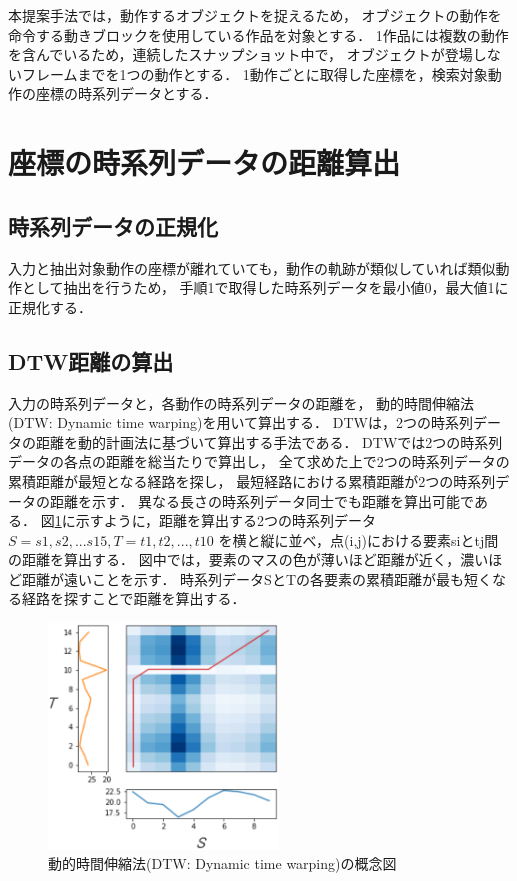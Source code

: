 \documentclass[11pt]{jreport}
\begin{document}
本提案手法では，動作するオブジェクトを捉えるため，
オブジェクトの動作を命令する動きブロックを使用している作品を対象とする．
1作品には複数の動作を含んでいるため，連続したスナップショット中で，
オブジェクトが登場しないフレームまでを1つの動作とする．
1動作ごとに取得した座標を，検索対象動作の座標の時系列データとする．

\section{座標の時系列データの距離算出}

\subsection{時系列データの正規化}
入力と抽出対象動作の座標が離れていても，動作の軌跡が類似していれば類似動作として抽出を行うため，
手順1で取得した時系列データを最小値0，最大値1に正規化する．

\subsection{DTW距離の算出}
入力の時系列データと，各動作の時系列データの距離を，
動的時間伸縮法(DTW: Dynamic time warping)を用いて算出する．
DTWは，2つの時系列データの距離を動的計画法に基づいて算出する手法である．
DTWでは2つの時系列データの各点の距離を総当たりで算出し，
全て求めた上で2つの時系列データの累積距離が最短となる経路を探し，
最短経路における累積距離が2つの時系列データの距離を示す．
異なる長さの時系列データ同士でも距離を算出可能である．
図\ref{dtw}に示すように，距離を算出する2つの時系列データ$S=s1,s2,...s15,T=t1,t2,...,t10$
を横と縦に並べ，点(i,j)における要素siとtj間の距離を算出する．
図中では，要素のマスの色が薄いほど距離が近く，濃いほど距離が遠いことを示す．
時系列データSとTの各要素の累積距離が最も短くなる経路を探すことで距離を算出する．

\begin{figure}[H]
    \centering
    \includegraphics[height=6cm]{dtw.eps}
    \caption{動的時間伸縮法(DTW: Dynamic time warping)の概念図}
    \label{dtw}
\end{figure}
\end{document}
